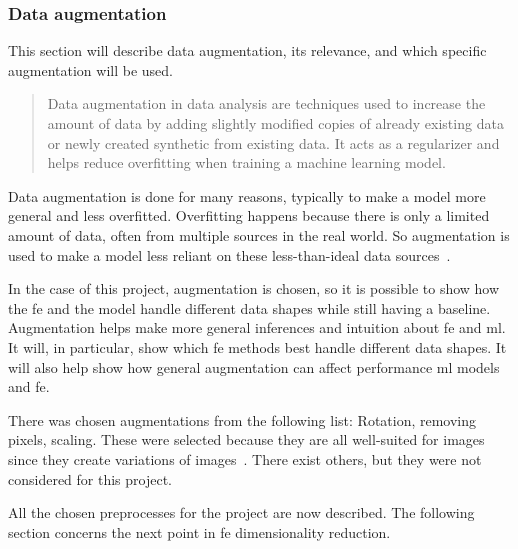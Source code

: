 \subsubsection{Data augmentation}\label{subsec:data-augmentation}
This section will describe data augmentation, its relevance, and which specific augmentation will be used.

\blockcquote{ShortenConnor2019AsoI}{Data augmentation in data analysis are techniques used to increase the amount of data by adding slightly modified copies of already existing data or newly created synthetic from existing data. It acts as a regularizer and helps reduce overfitting when training a machine learning model.}

Data augmentation is done for many reasons, typically to make a model more general and less overfitted. Overfitting happens because there is only a limited amount of data, often from multiple sources in the real world. So augmentation is used to make a model less reliant on these less-than-ideal data sources~\cite{MAHARANA202291}.

In the case of this project, augmentation is chosen, so it is possible to show how the \gls{fe} and the model handle different data shapes while still having a baseline. Augmentation helps make more general inferences and intuition about \gls{fe} and \gls{ml}. It will, in particular, show which \gls{fe} methods best handle different data shapes. It will also help show how general augmentation can affect performance \gls{ml} models and \gls{fe}.

There was chosen augmentations from the following list: Rotation, removing pixels, scaling. These were selected because they are all well-suited for images since they create variations of images~\cite{gonzalez2008digital}. There exist others, but they were not considered for this project.


All the chosen preprocesses for the project are now described. The following section concerns the next point in \gls{fe} dimensionality reduction.
